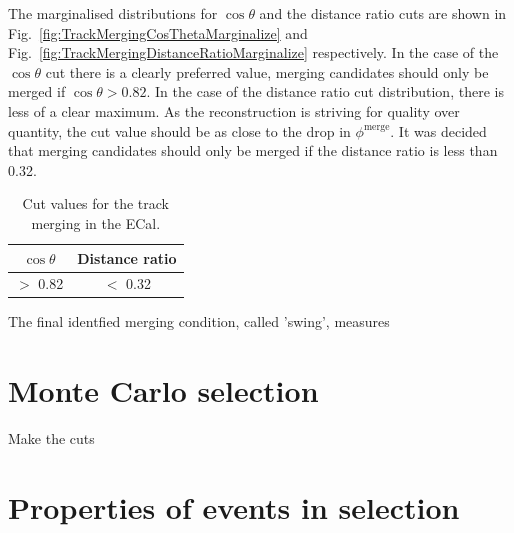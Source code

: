 The marginalised distributions for $\cos\theta$ and the distance ratio cuts are shown in Fig.~\ref{fig:TrackMergingCosThetaMarginalize} and Fig.~\ref{fig:TrackMergingDistanceRatioMarginalize} respectively.  In the case of the $\cos\theta$ cut there is a clearly preferred value, merging candidates should only be merged if $\cos\theta > 0.82$.  In the case of the distance ratio cut distribution, there is less of a clear maximum.  As the reconstruction is striving for quality over quantity, the cut value should be as close to the drop in $\phi^{\textrm{merge}}$.  It was decided that merging candidates should only be merged if the distance ratio is less than 0.32.
\begin{table}[b!]
  \begin{tabular}{ c c }
    $\cos\theta$ & Distance ratio \\ \hline \hline
    $>$ 0.82 & $<$ 0.32 \\
  \end{tabular}
  \caption{Cut values for the track merging in the ECal.}
  \label{table:VertexReconParameters}
\end{table}
The final identfied merging condition, called 'swing', measures 






\section{Monte Carlo selection}
Make the cuts

\section{Properties of events in selection}

